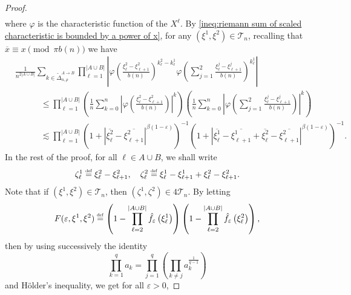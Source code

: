 \documentclass[10pt,a4paper]{amsart}
\newcommand{\1}{\mathds{1}}
\newcommand{\eqdef}{\stackrel{\scaleto{\mathrm{def}}{3.5pt}}{=}}
\numberwithin{equation}{section}
\begin{document}
\begin{proof}
\begin{align}
    \end{align}
    where $\varphi$ is the characteristic function of the $X^\ell$. By \eqref{ineq:riemann sum of scaled characteristic is bounded by a power of x}, for any $(\xi^1,\xi^2)\in\mathcal T_n$, recalling that $\overline x\equiv x\pmod{\pi b(n)}$ we have 
    \begin{align}
        &\frac{1}{n^{2|A\cup B|}}\sum_{k\in\widetilde\Delta_{n,\rho}^{A\rightarrow B}}\prod_{\ell=1}^{|A\cup B|}\left|\varphi\left(\frac{\xi_\ell^{2}-\xi_{\ell+1}^{2}}{b(n)}\right)^{k_\ell^{2}-k_\ell^{1}}\varphi\left(\sum_{j=1}^2\frac{\xi_\ell^j-\xi_{\ell+1}^j}{b(n)}\right)^{k_\ell^{1}}\right|\nonumber\\
        &\hspace{3em}\le \prod_{\ell=1}^{|A\cup B|}\left(\frac{1}{n}\sum_{k=0}^n\left|\varphi\left(\frac{\xi_\ell^{2}-\xi_{\ell+1}^{2}}{b(n)}\right)\right|^k\right)\left(\frac{1}{n}\sum_{k=0}^n\left|\varphi\left(\sum_{j=1}^2\frac{\xi_\ell^j-\xi_{\ell+1}^j}{b(n)}\right)\right|^k\right)\nonumber\\
        &\hspace{3em}\lesssim\prod_{\ell=1}^{|A\cup B|}\left(1+\left|\overline{\xi_\ell^{2}}-\overline{\xi_{\ell+1}^{2}}\right|^{\beta(1-\varepsilon)}\right)^{-1}\left(1+\left|\overline{\xi_\ell^{1}}-\overline{\xi_{\ell+1}^{1}}+\overline{\xi_\ell^{2}}-\overline{\xi_{\ell+1}^{2}}\right|^{\beta(1-\varepsilon)}\right)^{-1}.\label{ineq:bound for the expectation in error calculation}
    \end{align}
    In the rest of the proof, for all $\ell\in A\cup B$, we shall write
    \begin{equation*}
        \zeta_\ell^{1}\eqdef\xi_\ell^{2}-\xi_{\ell+1}^{2},\quad\zeta_\ell^{2}\eqdef\xi_\ell^{1}-\xi_{\ell+1}^{1}+\xi_\ell^{2}-\xi_{\ell+1}^{2}.
    \end{equation*}
    Note that if $(\xi^1,\xi^2)\in\mathcal T_n$, then $(\zeta^{1},\zeta^{2})\in4\mathcal T_n$. By letting 
    \begin{equation*}
        F(\varepsilon,\xi^1,\xi^2)\eqdef\left(1-\prod_{\ell=2}^{|A\cup B|}\hat f_\varepsilon\left(\xi_\ell^1\right)\right)\left(1-\prod_{\ell=2}^{|A\cup B|}\hat f_\varepsilon\left(\xi_\ell^2\right)\right),
    \end{equation*}
    then by using successively the identity
    \begin{equation*}
        \prod_{k=1}^qa_k=\prod_{j=1}^q\left(\prod_{k\ne j}a_k^{\frac{1}{q-1}}\right)
    \end{equation*}
    and Hölder's inequality, we get for all $\varepsilon>0$,

\end{proof}
\end{document}
